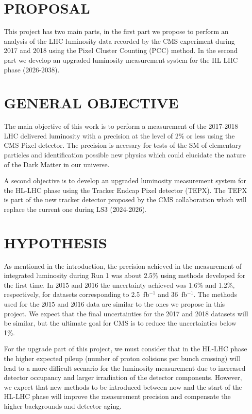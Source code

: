 \documentclass[final,12p]{article}
\newcommand{\lumi}[1]{{#1~fb$^{-1}$}}
\begin{document}
\section{PROPOSAL}

This project has two main parts, in the first part we propose to perform an analysis of the LHC luminosity data  recorded by the CMS experiment during 2017 and 2018 using the Pixel Cluster Counting (PCC) method.
In the second part we develop an upgraded luminosity measurement system for the HL-LHC phase (2026-2038).

\section{GENERAL OBJECTIVE}

The main objective of this work is to perform a measurement of the 2017-2018 LHC delivered luminosity with a precision at the level of 2\% or less using the CMS Pixel detector.
The precision is necesary for tests of the SM of elementary particles and identification possible new physics which could elucidate the nature of the Dark Matter in our universe. 

A second objective is to develop an  upgraded luminosity measurement system for the HL-LHC phase using the Tracker Endcap Pixel detector (TEPX). The TEPX is part of the new tracker detector proposed by the CMS collaboration which will replace the current one during LS3 (2024-2026). 

\section{HYPOTHESIS}

As mentioned in the introduction, the precision achieved in the measurement of integrated luminosity during Run 1 was about 2.5\% using  methods developed for the first time.
In 2015 and 2016 the uncertainty achieved was 1.6\% and 1.2\%, respectively, for datasets corresponding to \lumi{2.5} and \lumi{36}.
The methods used for the 2015 and 2016 data are similar to the ones we propose in this project.
We expect that the final uncertainties for the 2017 and 2018 datasets will be similar, but the ultimate goal for CMS is to reduce the uncertainties below 1\%.

For the upgrade part of this project, we must consider that in the HL-LHC phase the higher expected pileup (number of proton colisions per bunch crossing) will lead to a more difficult scenario for the luminosity measurement due to increased detector occupancy and larger irradiation of the detector components. 
However, we expect that new methods to be introduced between now and the start of the HL-LHC phase will improve the measurement precision and compensate the higher backgrounds and detector aging.  
\end{document}
